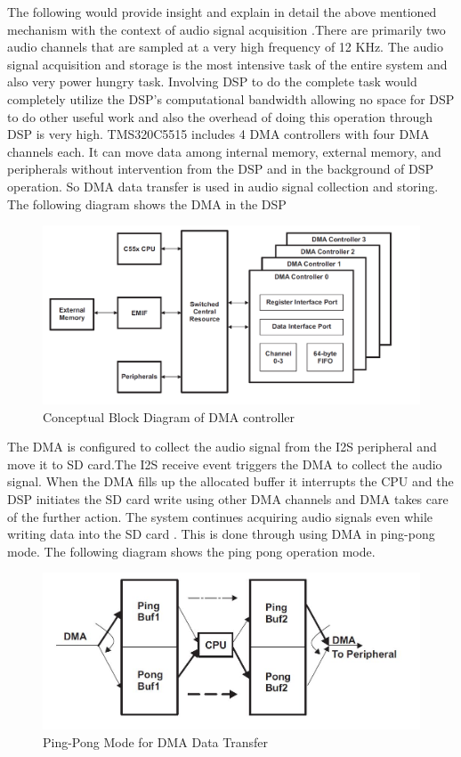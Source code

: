  The following would provide insight and explain in detail the above mentioned mechanism with the context of audio signal acquisition .There are primarily two audio channels that are sampled at a very high frequency of 12 KHz. The audio signal acquisition and storage is the most intensive task of the entire system and also very power hungry task. Involving DSP to do the complete task would completely utilize the DSP's computational bandwidth allowing no space for DSP to do other useful work and also the overhead of doing this operation through DSP is very high.  TMS320C5515 includes 4 DMA controllers with four DMA channels each. It can move data among internal memory, external memory, and peripherals without intervention from the DSP and in the background of DSP operation. So DMA data transfer is used in audio signal collection and storing.  The following diagram shows the DMA in the DSP 
 \begin{figure}[h]
 	\centering
 	\includegraphics[scale = 0.5 ]{DMA overview.PNG}
 	\caption{Conceptual Block Diagram of DMA controller\label{DMA_Architecture}}
 \end{figure} 
 The DMA is configured to collect the audio signal from the I2S peripheral and move it to SD card.The I2S receive event triggers the DMA to collect the audio signal. When the DMA fills up the allocated buffer it interrupts the CPU and the DSP initiates the SD card write using  other DMA channels and DMA takes care of the further action. The system continues acquiring audio signals even while writing data into the SD card . This is done through using DMA in ping-pong mode. The following diagram shows the ping pong operation mode.
  \begin{figure}[h]
 	\centering
 	\includegraphics[scale = 0.5 ]{ping_pong.JPG}
 	\caption{Ping-Pong Mode for DMA Data Transfer\label{ping_pong}}
 \end{figure}
